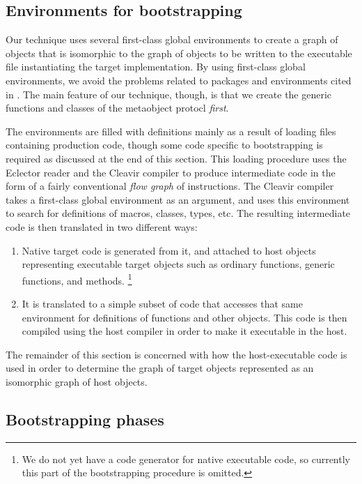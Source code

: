 \subsection{Environments for bootstrapping}

Our technique uses several first-class global environments
\cite{Strandh:2015:ELS:Environments} to create a graph of objects that
is isomorphic to the graph of objects to be written to the executable
file instantiating the target \commonlisp{} implementation.  By using
first-class global environments, we avoid the problems related to
packages and environments cited in .  The main
feature of our technique, though, is that we create the generic
functions and classes of the metaobject protocl \emph{first}.

The environments are filled with definitions mainly as a result of
loading files containing production \sicl{} code, though some code
specific to bootstrapping is required as discussed at the end of this
section.  This loading procedure uses the Eclector reader and the
Cleavir compiler to produce intermediate code in the form of a fairly
conventional \emph{flow graph} of instructions.  The Cleavir compiler
takes a first-class global environment as an argument, and uses this
environment to search for definitions of macros, classes, types, etc.
The resulting intermediate code is then translated in two different
ways:

\begin{enumerate}
\item Native target code is generated from it, and attached to host
  objects representing executable target objects such as ordinary
  functions, generic functions, and methods.%
  \footnote{We do not yet have a code generator for native executable
    code, so currently this part of the bootstrapping procedure is
    omitted.}
\item It is translated to a simple subset of \commonlisp{} code that
  accesses that same environment for definitions of functions and
  other objects.  This \commonlisp{} code is then compiled using the
  host compiler in order to make it executable in the host.
\end{enumerate}

The remainder of this section is concerned with how the
host-executable code is used in order to determine the graph of target
objects represented as an isomorphic graph of host objects.

\subsection{Bootstrapping phases}

